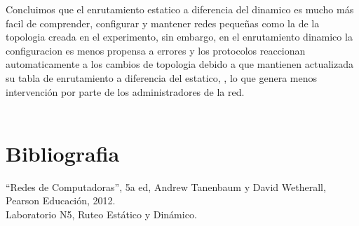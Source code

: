 \documentclass{article}
\begin{document}
Concluimos que el enrutamiento estatico a diferencia del dinamico es mucho más facil de comprender, configurar y mantener redes pequeñas como la de la topologia creada en el experimento, sin embargo, en el enrutamiento dinamico la configuracion es menos propensa a errores y los protocolos reaccionan automaticamente a los cambios de topologia debido a que mantienen actualizada su tabla de enrutamiento a diferencia del estatico, , lo que genera menos intervención por parte de los administradores de la red.\\\\


\section{Bibliografia}
“Redes de Computadoras”, 5a ed, Andrew Tanenbaum y David Wetherall, Pearson Educación, 2012.\\
Laboratorio N5, Ruteo Estático y Dinámico.\\
\end{document}
